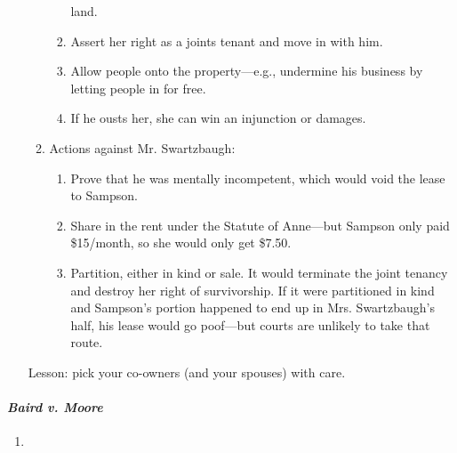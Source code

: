 \begin{enumerate}
\begin{enumerate}
\begin{enumerate}
            land.
            \item Assert her right as a joints tenant and move in with him.
            \item Allow people onto the property---e.g., undermine his 
            business by letting people in for free.
            \item If he ousts her, she can win an injunction or damages.
        \end{enumerate}
        \item Actions against Mr. Swartzbaugh:
        \begin{enumerate}
            \item Prove that he was mentally incompetent, which would void the 
            lease to Sampson.
            \item Share in the rent under the Statute of Anne---but Sampson 
            only paid \$15/month, so she would only get \$7.50.
            \item Partition, either in kind or sale. It would terminate the 
            joint tenancy and destroy her right of survivorship. If it were 
            partitioned in kind and Sampson's portion happened to end up in 
            Mrs. Swartzbaugh's half, his lease would go poof---but courts are 
            unlikely to take that route.
        \end{enumerate}
    \end{enumerate}
    Lesson: pick your co-owners (and your spouses) with care.
\end{enumerate}

\paragraph{\emph{Baird v. Moore}}

\begin{enumerate}
    \item %
\end{enumerate}

